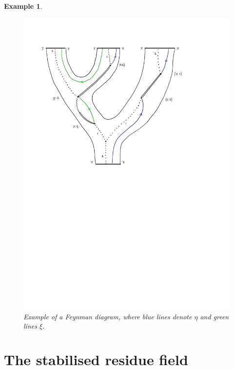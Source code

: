 \documentclass[english,letter paper,12pt,leqno]{article}
\theoremstyle{example}
\newtheorem{example}[theorem]{Example}
\numberwithin{equation}{section}
\begin{document}
\begin{example}
\begin{figure}
\begin{center}
\includegraphics[scale=1.0]{dia16}
\end{center}
\centering
\caption{Example of a Feynman diagram, where blue lines denote $\eta$ and green lines $\xi$.}\label{fig:feynman_1}
\end{figure}
\end{example}

\section{The stabilised residue field}\label{section:generator}
\end{document}
